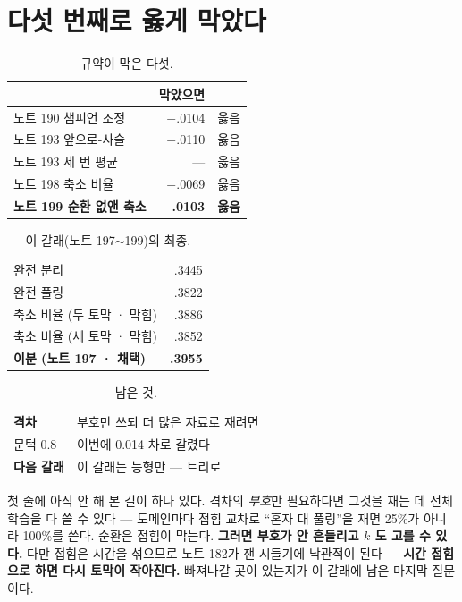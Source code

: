 \documentclass[10pt]{article}
\begin{document}
\section{다섯 번째로 옳게 막았다}


\begin{table}[t]
\centering\tsize
\caption{규약이 막은 다섯.}
\begin{tabular}{lrl}
\toprule
& 막았으면 & \\
\midrule
노트 190 챔피언 조정 & $-$.0104 & 옳음 \\
노트 193 앞으로-사슬 & $-$.0110 & 옳음 \\
노트 193 세 번 평균 & --- & 옳음 \\
노트 198 축소 비율 & $-$.0069 & 옳음 \\
\textbf{노트 199 순환 없앤 축소} & \textbf{$-$.0103} & \textbf{옳음} \\
\bottomrule
\end{tabular}
\end{table}


\begin{table}[t]
\centering\tsize
\caption{이 갈래(노트 197$\sim$199)의 최종.}
\begin{tabular}{lr}
\toprule
완전 분리 & .3445 \\
완전 풀링 & .3822 \\
축소 비율 (두 토막 · 막힘) & .3886 \\
축소 비율 (세 토막 · 막힘) & .3852 \\
\textbf{이분 (노트 197 · 채택)} & \textbf{.3955} \\
\bottomrule
\end{tabular}
\end{table}

\begin{table}[t]
\centering\tsize
\caption{남은 것.}
\begin{tabular}{ll}
\toprule
\textbf{격차} & 부호만 쓰되 더 많은 자료로 재려면 \\
문턱 0.8 & 이번에 0.014 차로 갈렸다 \\
\textbf{다음 갈래} & 이 갈래는 능형만 --- 트리로 \\
\bottomrule
\end{tabular}
\end{table}

첫 줄에 아직 안 해 본 길이 하나 있다. 격차의 \emph{부호}만 필요하다면 그것을
재는 데 전체 학습을 다 쓸 수 있다 --- 도메인마다 접힘 교차로 ``혼자 대
풀링''을 재면 25\%가 아니라 100\%를 쓴다. 순환은 접힘이 막는다.
\textbf{그러면 부호가 안 흔들리고 $k$ 도 고를 수 있다.} 다만 접힘은 시간을
섞으므로 노트 182가 잰 시들기에 낙관적이 된다 --- \textbf{시간 접힘으로
하면 다시 토막이 작아진다.} 빠져나갈 곳이 있는지가 이 갈래에 남은 마지막
질문이다.
\end{document}
